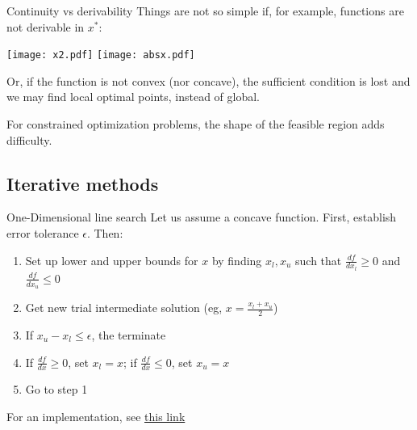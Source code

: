 \documentclass[c]{beamer}
\begin{document}
\begin{frame}[t]{Continuity vs derivability}
  Things are not so simple if, for example, functions are not derivable in $x^*$:
  \begin{center}
    \texttt{[image: x2.pdf]}
    \texttt{[image: absx.pdf]}
  \end{center}
  Or, if the function is not convex (nor concave), the sufficient condition is lost and we may find local optimal points, instead of global.

  For constrained optimization problems, the shape of the feasible region adds difficulty.
\end{frame}




\subsection{Iterative methods}

\begin{frame}{One-Dimensional line search}
Let us assume a concave function. First, establish error tolerance $\epsilon$. Then:
  \begin{enumerate}
    \item Set up lower and upper bounds for $x$ by finding $x_l,x_u$ such that $\frac{df}{dx_l}\geq 0$ and $\frac{df}{dx_u}\leq 0$
    \item Get new trial intermediate solution (eg, $x=\frac{x_l+x_u}{2}$)
    \item If $x_u-x_l\leq \epsilon$, the terminate
    \item If $\frac{df}{dx}\geq 0$, set $x_l=x$; if $\frac{df}{dx}\leq 0$, set $x_u=x$
    \item Go to step 1
  \end{enumerate}

  For an implementation, see \href{https://machinelearningmastery.com/line-search-optimization-with-python/}{this link}
\end{frame}
\end{document}
